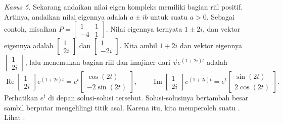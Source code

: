 \begin{myfig}
\parbox[t]{3.0in}{
 \capstart
 \caption{Contoh medan vektor pusat.\label{pln:ellipsesfig}}
}
\quad
\parbox[t]{3.0in}{
 \capstart
 \caption{Contoh medan vektor sumber spiral.\label{pln:spiral-sourcefig}}
}
\end{myfig}

\medskip

\emph{Kasus 5.} Sekarang andaikan nilai eigen kompleks memiliki bagian riil
positif.  Artinya, andaikan nilai eigennya adalah $a \pm ib$ untuk suatu $a > 0$.
Sebagai contoh, misalkan $P = 
\left[ \begin{smallmatrix} 1 & 1 \\ -4 & 1 \end{smallmatrix} \right]$.
Nilai eigennya ternyata $1\pm 2i$, dan vektor eigennya adalah
$\left[ \begin{smallmatrix} 1 \\ 2i \end{smallmatrix} \right]$ dan
$\left[ \begin{smallmatrix} 1 \\ -2i \end{smallmatrix} \right]$.  Kita ambil
$1 + 2i$ dan vektor eigennya
$\left[ \begin{smallmatrix} 1 \\ 2i \end{smallmatrix} \right]$, lalu menemukan
bagian riil dan imajiner dari
$\vec{v} e^{(1+2i)t}$ adalah
\begin{equation*}
\operatorname{Re}
\begin{bmatrix} 1 \\ 2i \end{bmatrix} e^{(1+2i)t} =
e^t
\begin{bmatrix} \cos (2t) \\ -2 \sin (2t)  \end{bmatrix} ,
\qquad
\operatorname{Im}
\begin{bmatrix} 1 \\ 2i \end{bmatrix} e^{(1+2i)t} =
e^t
\begin{bmatrix} \sin (2t) \\ 2 \cos (2t) \end{bmatrix} .
\end{equation*}
Perhatikan $e^t$ di depan solusi-solusi tersebut.  Solusi-solusinya
bertambah besar sambil berputar mengelilingi titik asal.  Karena itu, kita memperoleh
suatu \emph{}.
Lihat .

